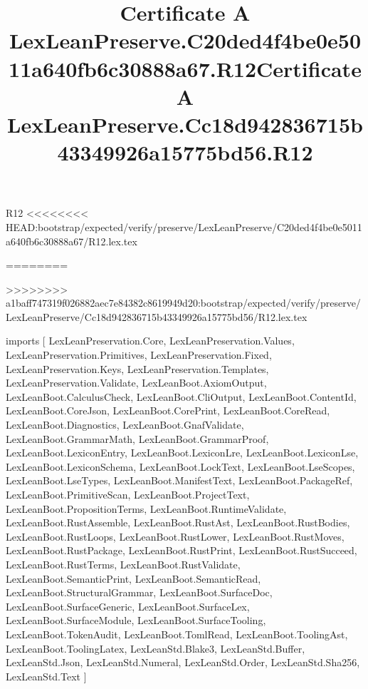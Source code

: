 \begin{lexlean}{R12}
<<<<<<<< HEAD:bootstrap/expected/verify/preserve/LexLeanPreserve/C20ded4f4be0e5011a640fb6c30888a67/R12.lex.tex
\title{Certificate A LexLeanPreserve.C20ded4f4be0e5011a640fb6c30888a67.R12}
========
\title{Certificate A LexLeanPreserve.Cc18d942836715b43349926a15775bd56.R12}
>>>>>>>> a1baff747319f026882aec7e84382c8619949d20:bootstrap/expected/verify/preserve/LexLeanPreserve/Cc18d942836715b43349926a15775bd56/R12.lex.tex
\begin{coremodule}
imports [
  LexLeanPreservation.Core,
  LexLeanPreservation.Values,
  LexLeanPreservation.Primitives,
  LexLeanPreservation.Fixed,
  LexLeanPreservation.Keys,
  LexLeanPreservation.Templates,
  LexLeanPreservation.Validate,
  LexLeanBoot.AxiomOutput,
  LexLeanBoot.CalculusCheck,
  LexLeanBoot.CliOutput,
  LexLeanBoot.ContentId,
  LexLeanBoot.CoreJson,
  LexLeanBoot.CorePrint,
  LexLeanBoot.CoreRead,
  LexLeanBoot.Diagnostics,
  LexLeanBoot.GnafValidate,
  LexLeanBoot.GrammarMath,
  LexLeanBoot.GrammarProof,
  LexLeanBoot.LexiconEntry,
  LexLeanBoot.LexiconLre,
  LexLeanBoot.LexiconLse,
  LexLeanBoot.LexiconSchema,
  LexLeanBoot.LockText,
  LexLeanBoot.LseScopes,
  LexLeanBoot.LseTypes,
  LexLeanBoot.ManifestText,
  LexLeanBoot.PackageRef,
  LexLeanBoot.PrimitiveScan,
  LexLeanBoot.ProjectText,
  LexLeanBoot.PropositionTerms,
  LexLeanBoot.RuntimeValidate,
  LexLeanBoot.RustAssemble,
  LexLeanBoot.RustAst,
  LexLeanBoot.RustBodies,
  LexLeanBoot.RustLoops,
  LexLeanBoot.RustLower,
  LexLeanBoot.RustMoves,
  LexLeanBoot.RustPackage,
  LexLeanBoot.RustPrint,
  LexLeanBoot.RustSucceed,
  LexLeanBoot.RustTerms,
  LexLeanBoot.RustValidate,
  LexLeanBoot.SemanticPrint,
  LexLeanBoot.SemanticRead,
  LexLeanBoot.StructuralGrammar,
  LexLeanBoot.SurfaceDoc,
  LexLeanBoot.SurfaceGeneric,
  LexLeanBoot.SurfaceLex,
  LexLeanBoot.SurfaceModule,
  LexLeanBoot.SurfaceTooling,
  LexLeanBoot.TokenAudit,
  LexLeanBoot.TomlRead,
  LexLeanBoot.ToolingAst,
  LexLeanBoot.ToolingLatex,
  LexLeanStd.Blake3,
  LexLeanStd.Buffer,
  LexLeanStd.Json,
  LexLeanStd.Numeral,
  LexLeanStd.Order,
  LexLeanStd.Sha256,
  LexLeanStd.Text
]


\end{coremodule}
\end{lexlean}
